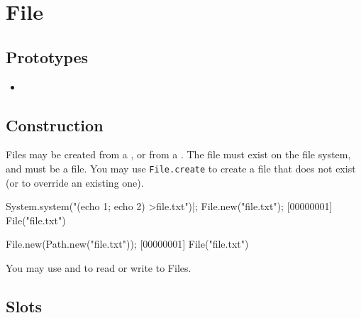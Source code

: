 \section{File}

\subsection{Prototypes}
\begin{itemize}
\item {}
\end{itemize}

\subsection{Construction}

Files may be created from a , or from a
.  The file must exist on the file system, and must be
a file.  You may use \lstinline|File.create| to create a file that
does not exist (or to override an existing one).

\begin{urbiscript}[firstnumber=1]
System.system("(echo 1; echo 2) >file.txt")|;
File.new("file.txt");
[00000001] File("file.txt")

File.new(Path.new("file.txt"));
[00000001] File("file.txt")
\end{urbiscript}

You may use  and  to
read or write to Files.

\subsection{Slots}

